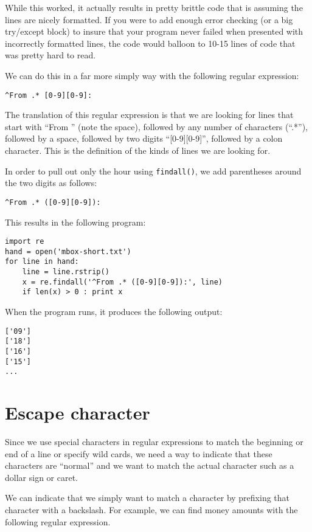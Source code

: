 While this worked, it actually results in pretty brittle code that is assuming the lines are nicely
formatted.  If you were to add enough error checking (or a big try/except block) to insure that your
program never failed when presented with incorrectly formatted lines, the code would balloon to
10-15 lines of code that was pretty hard to read.

We can do this in a far more simply way with the following regular expression:

\beforeverb
\begin{verbatim}
^From .* [0-9][0-9]:
\end{verbatim}
\afterverb
%
The translation of this regular expression is that we are looking for lines that start with ``From ''
(note the space), followed by any number of characters (``.*''), followed by a space, followed by two
digits ``[0-9][0-9]'', followed by a colon character.  This is the definition of the kinds of lines
we are looking for.

In order to pull out only the hour using {\tt findall()}, we add parentheses around the two digits
as follows:

\beforeverb
\begin{verbatim}
^From .* ([0-9][0-9]):
\end{verbatim}
\afterverb
%
This results in the following program:

\beforeverb
\begin{verbatim}
import re
hand = open('mbox-short.txt')
for line in hand:
    line = line.rstrip()
    x = re.findall('^From .* ([0-9][0-9]):', line)
    if len(x) > 0 : print x
\end{verbatim}
\afterverb
%
When the program runs, it produces the following output:

\beforeverb
\begin{verbatim}
['09']
['18']
['16']
['15']
...
\end{verbatim}
\afterverb
%
\section{Escape character}

Since we use special characters in regular expressions to match the beginning or end of
a line or specify wild cards, we need a way to indicate that these characters are ``normal''
and we want to match the actual character such as a dollar sign or caret.

We can indicate that we simply want to match a character by prefixing that character
with a backslash.  For example, we can find money amounts with the following regular
expression.

